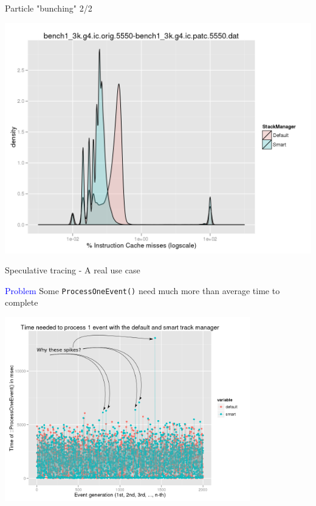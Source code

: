 \documentclass{beamer}
\begin{document}
\begin{frame}{Particle "bunching" 2/2}
\begin{center}
  \includegraphics[width=1.0\textwidth]{histcmpicm.png}
\end{center}
\end{frame}

\begin{frame}{Speculative tracing - A real use case}

\textcolor{blue}{Problem} Some {\tt ProcessOneEvent()} need much more than
average time to complete

\begin{center}
  \includegraphics[width=0.8\textwidth]{evts1-arrows.png}
\end{center}
\end{frame}
\end{document}
